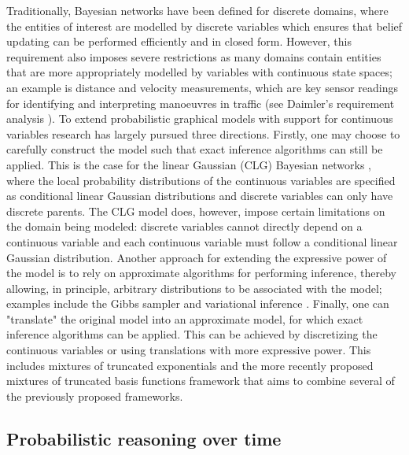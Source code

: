 Traditionally, Bayesian networks have been defined for discrete domains, where the entities of interest are modelled by discrete variables which ensures that belief updating can be performed efficiently and in closed form. However, this requirement also imposes severe restrictions as many domains contain entities that are more appropriately modelled by variables with continuous state spaces; an example is distance and velocity measurements, which are key sensor readings for identifying and interpreting manoeuvres in traffic (see Daimler's requirement analysis \cite{Fer14}). To extend probabilistic graphical models with support for continuous variables research has largely pursued three directions. Firstly, one may choose to carefully construct the model such that exact inference algorithms can still be applied. This is the case for the linear Gaussian (CLG) Bayesian networks \cite{Lauritzen1992,LauritzenJensen2001}, where the local probability distributions of the continuous variables are specified as conditional linear Gaussian distributions and discrete variables can only have discrete parents. The CLG model does, however, impose certain limitations on the domain being modeled: discrete variables cannot directly depend on a continuous variable and each continuous variable must follow a conditional linear Gaussian distribution. Another approach for extending the expressive power of the model is to rely on approximate algorithms for performing inference, thereby allowing, in principle, arbitrary distributions to be associated with the model; examples include the Gibbs sampler \cite{Geman1984, hrycej1990gibbs} and variational inference \cite{Jordan1999}. Finally, one can "translate" the original model into an approximate model, for which exact inference algorithms can be applied. This can be achieved by discretizing the continuous variables \cite{KozlovKollerUAI97} or using translations with more expressive power. This includes mixtures of truncated exponentials \cite{Moral2001} and the more recently proposed mixtures of truncated basis functions framework \cite{Langseth12} that aims to combine several of the previously proposed frameworks.

\subsection{Probabilistic reasoning over time}\label{SubSection:DBNs}

